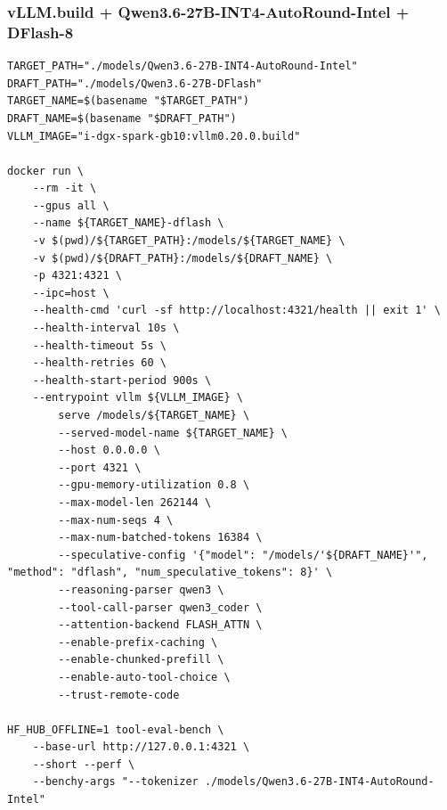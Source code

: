 \documentclass{article}
\begin{document}
\subsubsection{vLLM.build + Qwen3.6-27B-INT4-AutoRound-Intel + DFlash-8}
\begin{lstlisting}
TARGET_PATH="./models/Qwen3.6-27B-INT4-AutoRound-Intel"
DRAFT_PATH="./models/Qwen3.6-27B-DFlash"
TARGET_NAME=$(basename "$TARGET_PATH")
DRAFT_NAME=$(basename "$DRAFT_PATH")
VLLM_IMAGE="i-dgx-spark-gb10:vllm0.20.0.build"

docker run \
    --rm -it \
    --gpus all \
    --name ${TARGET_NAME}-dflash \
    -v $(pwd)/${TARGET_PATH}:/models/${TARGET_NAME} \
    -v $(pwd)/${DRAFT_PATH}:/models/${DRAFT_NAME} \
    -p 4321:4321 \
    --ipc=host \
    --health-cmd 'curl -sf http://localhost:4321/health || exit 1' \
    --health-interval 10s \
    --health-timeout 5s \
    --health-retries 60 \
    --health-start-period 900s \
    --entrypoint vllm ${VLLM_IMAGE} \
        serve /models/${TARGET_NAME} \
        --served-model-name ${TARGET_NAME} \
        --host 0.0.0.0 \
        --port 4321 \
        --gpu-memory-utilization 0.8 \
        --max-model-len 262144 \
        --max-num-seqs 4 \
        --max-num-batched-tokens 16384 \
        --speculative-config '{"model": "/models/'${DRAFT_NAME}'", "method": "dflash", "num_speculative_tokens": 8}' \
        --reasoning-parser qwen3 \
        --tool-call-parser qwen3_coder \
        --attention-backend FLASH_ATTN \
        --enable-prefix-caching \
        --enable-chunked-prefill \
        --enable-auto-tool-choice \
        --trust-remote-code

HF_HUB_OFFLINE=1 tool-eval-bench \
    --base-url http://127.0.0.1:4321 \
    --short --perf \
    --benchy-args "--tokenizer ./models/Qwen3.6-27B-INT4-AutoRound-Intel"
\end{lstlisting}
\end{document}
